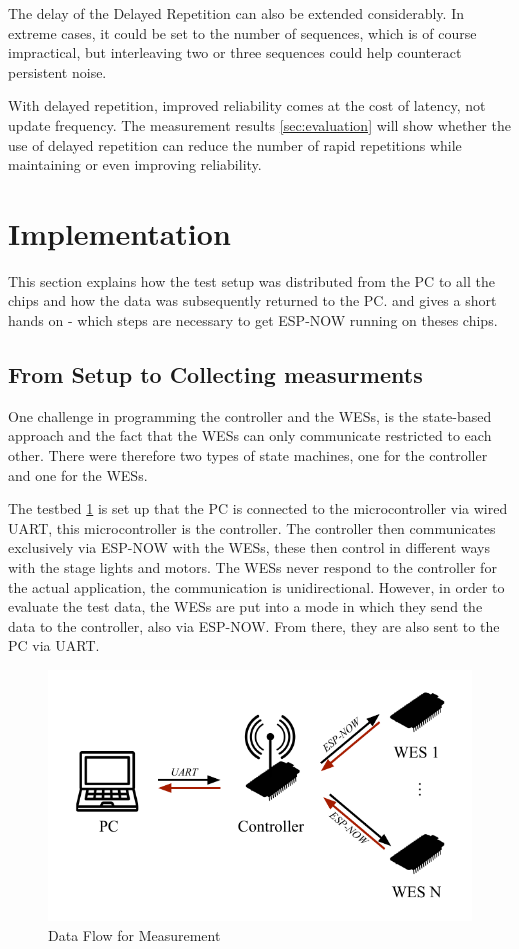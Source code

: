 The delay of the Delayed Repetition can also be extended considerably.
In extreme cases, it could be set to the number of sequences, which is of course impractical,
but interleaving two or three sequences could help counteract persistent noise.

With delayed repetition, improved reliability comes at the cost of latency, not update frequency.
The measurement results \cref{sec:evaluation} will show whether the use of delayed repetition can reduce the number of rapid repetitions 
while maintaining or even improving reliability.

\section{Implementation}

This section explains how the test setup was distributed from the PC to all the chips 
and how the data was subsequently returned to the PC.
and gives a short hands on - which steps are necessary to get ESP-NOW running on theses chips.

\subsection{From Setup to Collecting measurments}

One challenge in programming the controller and the WESs,
is the state-based approach and the fact that the WESs can only communicate restricted to each other.
There were therefore two types of state machines, one for the controller and one for the WESs.

The testbed \cref{fig:testbed} is set up that the PC is connected to the microcontroller via wired \ac{UART}, this microcontroller is the controller.
The controller then communicates exclusively via ESP-NOW with the WESs,
these then control in different ways with the stage lights and motors.
The WESs never respond to the controller for the actual application, the communication is unidirectional.
However, in order to evaluate the test data, the WESs are put into a mode in which they send the data to the controller, also via ESP-NOW.
From there, they are also sent to the PC via UART.

\begin{figure}[h]
	\centering
	\includegraphics[scale=0.75]{figures/TestFlow.pdf}
	\caption{Data Flow for Measurement}
	\label{fig:testbed}
\end{figure}

